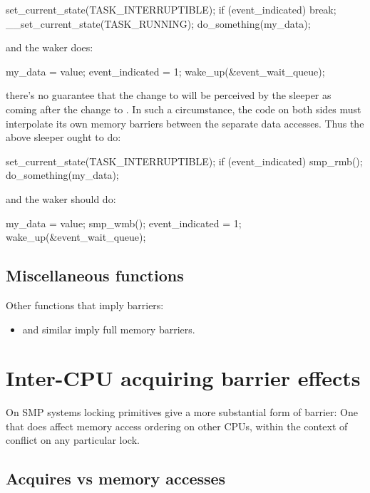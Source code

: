\begin{VerbatimU}
	set_current_state(TASK_INTERRUPTIBLE);
	if (event_indicated)
		break;
	__set_current_state(TASK_RUNNING);
	do_something(my_data);
\end{VerbatimU}

and the waker does:

\begin{VerbatimU}
	my_data = value;
	event_indicated = 1;
	wake_up(&event_wait_queue);
\end{VerbatimU}

there's no guarantee that the change to  will be
perceived by the sleeper as coming after the change to .
In such a circumstance, the code on both sides must interpolate its own
memory barriers between the separate data accesses.
Thus the above sleeper ought to do:

\begin{VerbatimU}
	set_current_state(TASK_INTERRUPTIBLE);
	if (event_indicated) {
		smp_rmb();
		do_something(my_data);
	}
\end{VerbatimU}

and the waker should do:

\begin{VerbatimU}
	my_data = value;
	smp_wmb();
	event_indicated = 1;
	wake_up(&event_wait_queue);
\end{VerbatimU}

\subsection{Miscellaneous functions}

Other functions that imply barriers:

\begin{itemize}
 \item {} and similar imply full memory barriers.
\end{itemize}


\section{Inter-CPU acquiring barrier effects}

On SMP systems locking primitives give a more substantial form of barrier:
One that does affect memory access ordering on other CPUs, within the
context of conflict on any particular lock.


\subsection{Acquires vs memory accesses}

